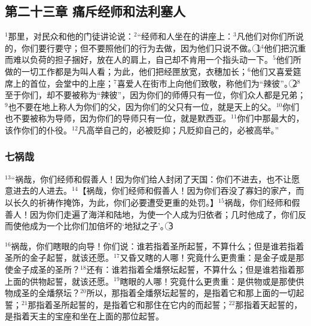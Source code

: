 \subsection{第二十三章 痛斥经师和法利塞人}
$^{1}$那里，\UL[耶稣]对民众和他的门徒讲论说：$^{2}$“经师和\UL[法利塞]人坐在\UL[梅瑟]的讲座上：$^{3}$凡他们对你们所说的，你们要行要守；但不要照他们的行为去做，因为他们只说不做。\textcircled{1}$^{4}$他们把沉重而难以负荷的担子捆好，放在人的肩上，自己却不肯用一个指头动一下。$^{5}$他们所做的一切工作都是为叫人看；为此，他们把经匣放宽，衣穗加长；$^{6}$他们又喜爱筵席上的首位，会堂中的上座；$^{7}$喜爱人在街市上向他们致敬，称他们为“辣彼”。\textcircled{2}$^{8}$至于你们，却不要被称为“辣彼”，因为你们的师傅只有一位，你们众人都是兄弟；$^{9}$也不要在地上称人为你们的父，因为你们的父只有一位，就是天上的父。$^{10}$你们也不要被称为导师，因为你们的导师只有一位，就是默西亚。$^{11}$你们中那最大的，该作你们的仆役。$^{12}$凡高举自己的，必被贬抑；凡贬抑自己的，必被高举。”


\subsubsection{七祸哉}
$^{13}$“祸哉，你们经师和\UL[法利塞]假善人！因为你们给人封闭了天国：你们不进去，也不让愿意进去的人进去。$^{14}$【祸哉，你们经师和\UL[法利塞]假善人！因为你们吞没了寡妇的家产，而以长久的祈祷作掩饰，为此，你们必要遭受更重的处罚。】$^{15}$祸哉，你们经师和\UL[法利塞]假善人！因为你们走遍了海洋和陆地，为使一个人成为归依者；几时他成了，你们反而使他成为一个比你们加倍坏的‘地狱之子’。\textcircled{3}

$^{16}$祸哉，你们瞎眼的向导！你们说：谁若指着圣所起誓，不算什么；但是谁若指着圣所的金子起誓，就该还愿。$^{17}$又昏又瞎的人哪！究竟什么更贵重：是金子或是那使金子成圣的圣所？$^{18}$还有：谁若指着全燔祭坛起誓，不算什么；但是谁若指着那上面的供物起誓，就该还愿。$^{19}$瞎眼的人哪！究竟什么更贵重：是供物或是那使供物成圣的全燔祭坛？$^{20}$所以，那指着全燔祭坛起誓的，是指着它和那上面的一切起誓；$^{21}$那指着圣所起誓的，是指着它和那住在它内的而起誓；$^{22}$那指着天起誓的，是指着天主的宝座和坐在上面的那位起誓。

